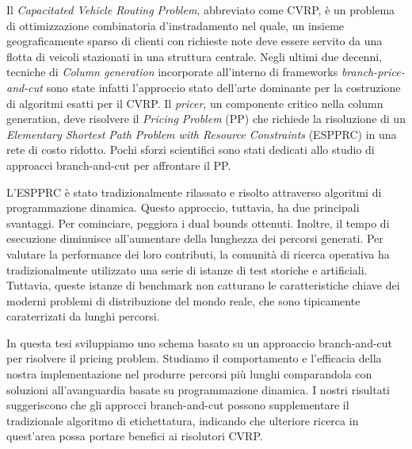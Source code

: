 {
\setlength\parindent{0pt}

Il \textit{Capacitated Vehicle Routing Problem}, abbreviato come CVRP,
è un problema di ottimizzazione combinatoria d'instradamento nel quale,
un insieme geograficamente sparso di clienti con richieste note
deve essere servito da una flotta di veicoli stazionati in una struttura centrale.
Negli ultimi due decenni,
tecniche di \textit{Column generation} incorporate all'interno di frameworks \textit{branch-price-and-cut}
sono state infatti l'approccio stato dell'arte dominante per la costruzione di algoritmi esatti per il CVRP.
Il \textit{pricer}, un componente critico nella column generation, deve risolvere
il \textit{Pricing Problem} (PP) che richiede la risoluzione di un
\textit{Elementary Shortest Path Problem with Resource Constraints} (ESPPRC)
in una rete di costo ridotto.
Pochi sforzi scientifici sono stati dedicati allo studio di approacci
branch-and-cut per affrontare il PP.

L'ESPPRC è stato tradizionalmente rilassato e risolto attraverso algoritmi di programmazione dinamica.
Questo approccio, tuttavia, ha due principali svantaggi.
Per cominciare, peggiora i dual bounds ottenuti.
Inoltre, il tempo di esecuzione diminuisce all'aumentare della lunghezza dei percorsi generati.
Per valutare la performance dei loro contributi,
la comunità di ricerca operativa ha tradizionalmente utilizzato una serie di istanze
di test storiche e artificiali.
Tuttavia, queste istanze di benchmark non catturano le caratteristiche chiave dei moderni problemi di distribuzione del mondo reale, che sono tipicamente caraterrizati da lunghi percorsi.

In questa tesi sviluppiamo
uno schema basato su un approaccio branch-and-cut per risolvere il pricing problem.
Studiamo il comportamento e l'efficacia della nostra implementazione nel produrre percorsi più lunghi comparandola con soluzioni all'avanguardia basate su programmazione dinamica.
I nostri risultati suggeriscono che gli approcci branch-and-cut possono supplementare il tradizionale algoritmo di etichettatura, indicando che ulteriore ricerca in quest'area possa portare benefici ai risolutori CVRP.
}
